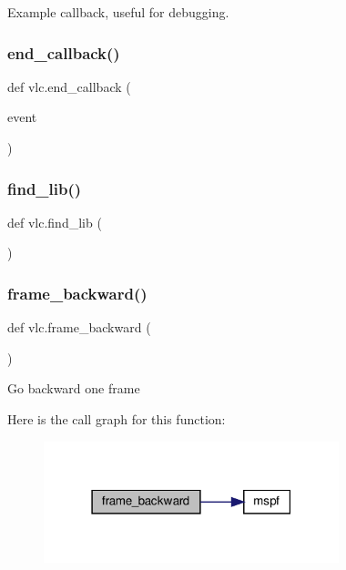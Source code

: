 \begin{DoxyVerb}Example callback, useful for debugging.
\end{DoxyVerb}
 \mbox{\label{namespacevlc_a93ea3b472864341c8419502bd4c6a1a7}} 
\subsubsection{\texorpdfstring{end\+\_\+callback()}{end\_callback()}}
{\footnotesize\ttfamily def vlc.\+end\+\_\+callback (\begin{DoxyParamCaption}\item[{}]{event }\end{DoxyParamCaption})}

\mbox{\label{namespacevlc_abf92ade0b4708a70f460beddb052b761}} 
\subsubsection{\texorpdfstring{find\+\_\+lib()}{find\_lib()}}
{\footnotesize\ttfamily def vlc.\+find\+\_\+lib (\begin{DoxyParamCaption}{ }\end{DoxyParamCaption})}

\mbox{\label{namespacevlc_ae7c9e2320876e2cfde006a90ff8ebd90}} 
\subsubsection{\texorpdfstring{frame\+\_\+backward()}{frame\_backward()}}
{\footnotesize\ttfamily def vlc.\+frame\+\_\+backward (\begin{DoxyParamCaption}{ }\end{DoxyParamCaption})}

\begin{DoxyVerb}Go backward one frame\end{DoxyVerb}
 Here is the call graph for this function\+:
\nopagebreak
\begin{figure}[H]
\begin{center}
\leavevmode
\includegraphics[width=243pt]{namespacevlc_ae7c9e2320876e2cfde006a90ff8ebd90_cgraph}
\end{center}
\end{figure}
\mbox{\label{namespacevlc_a8ca4660553489d4345fe15e1ff1267a6}} 
